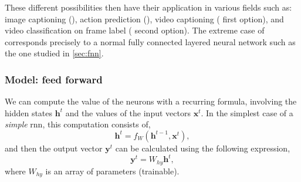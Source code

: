 These different possibilities then have their application in various fields
such as: image captioning (), action prediction (), video captioning ( first option), and video
classification on frame label ( second option). The extreme
case of  corresponds precisely to a normal fully connected
layered neural network such as the one studied in \vref{sec:fnn}.

\subsubsection{Model: feed forward}

We can compute the value of the neurons with a recurring formula, involving the
hidden states \(\mathbf{h}^t\) and the values of the input vectors
\(\mathbf{x}^t\). In the simplest case of a \emph{simple} \gls{rnn}, this
computation consists of,
\begin{equation} \label{eq:rnn-hidden}
  \mathbf{h}^t = f_{W} (\mathbf{h}^{t - 1}, \mathbf{x}^t),
\end{equation}
and then the output vector \(\mathbf{y}^t\) can be calculated using the
following expression,
\begin{equation} \label{eq:rnn-out}
  \mathbf{y}^t = W_{hy}\mathbf{h}^t,
\end{equation}
where \(W_{hy}\) is an array of parameters (trainable).


